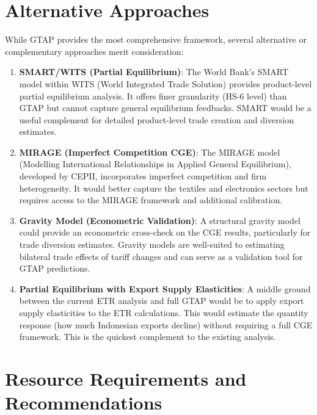 \documentclass[12pt,a4paper]{article}
\begin{document}
\section{Alternative Approaches}
\label{sec:alternatives}

While GTAP provides the most comprehensive framework, several alternative or complementary approaches merit consideration:

\begin{enumerate}
    \item \textbf{SMART/WITS (Partial Equilibrium)}:
    The World Bank's SMART model within WITS (World Integrated Trade Solution) provides product-level partial equilibrium analysis. It offers finer granularity (HS-6 level) than GTAP but cannot capture general equilibrium feedbacks. SMART would be a useful complement for detailed product-level trade creation and diversion estimates.

    \item \textbf{MIRAGE (Imperfect Competition CGE)}:
    The MIRAGE model (Modelling International Relationships in Applied General Equilibrium), developed by CEPII, incorporates imperfect competition and firm heterogeneity. It would better capture the textiles and electronics sectors but requires access to the MIRAGE framework and additional calibration.

    \item \textbf{Gravity Model (Econometric Validation)}:
    A structural gravity model could provide an econometric cross-check on the CGE results, particularly for trade diversion estimates. Gravity models are well-suited to estimating bilateral trade effects of tariff changes and can serve as a validation tool for GTAP predictions.

    \item \textbf{Partial Equilibrium with Export Supply Elasticities}:
    A middle ground between the current ETR analysis and full GTAP would be to apply export supply elasticities to the ETR calculations. This would estimate the quantity response (how much Indonesian exports decline) without requiring a full CGE framework. This is the quickest complement to the existing analysis.
\end{enumerate}

\section{Resource Requirements and Recommendations}
\label{sec:resources}
\end{document}
